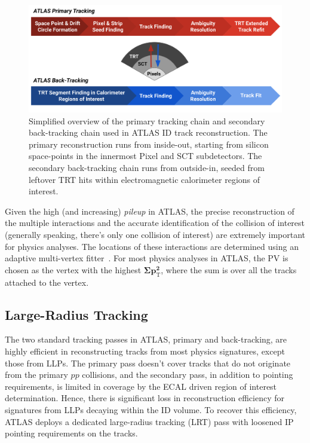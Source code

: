 \begin{figure}[!ht]
    \centering
    \includegraphics[width=0.8\linewidth]{figures//experiment/trackingSteps.png}
    \caption{Simplified overview of the primary tracking chain and secondary back-tracking chain used in ATLAS ID track reconstruction. The primary reconstruction runs from inside-out, starting from silicon space-points in the innermost Pixel and SCT subdetectors. The secondary back-tracking chain runs from outside-in, seeded from leftover TRT hits within electromagnetic calorimeter regions of interest.~\cite{atlascollaboration2023software}}
    \label{fig:track-steps}
\end{figure}

Given the high (and increasing) \textit{pileup} in ATLAS, the precise reconstruction of the multiple interactions and the accurate identification of the collision of interest (generally speaking, there's only one collision of interest) are extremely important for physics analyses. The locations of these interactions are determined using an adaptive multi-vertex fitter~\cite{Waltenberger_2007}. For most physics analyses in ATLAS, the PV is chosen as the vertex with the highest $\boldsymbol{\Sigma p_\mathrm{T}^2}$, where the sum is over all the tracks attached to the vertex.

\subsection{Large-Radius Tracking}
The two standard tracking passes in ATLAS, primary and back-tracking, are highly efficient in reconstructing tracks from most physics signatures, except those from LLPs. The primary pass doesn't cover tracks that do not originate from the primary $pp$ collisions, and the secondary pass, in addition to pointing requirements, is limited in coverage by the ECAL driven region of interest determination. Hence, there is significant loss in reconstruction efficiency for signatures from LLPs decaying within the ID volume. To recover this efficiency, ATLAS deploys a dedicated large-radius tracking (LRT) pass with loosened IP pointing requirements on the tracks. 

